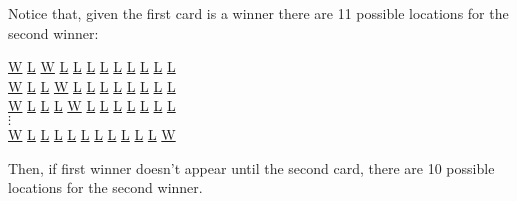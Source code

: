 \documentclass[11pt]{article}
\begin{document}
Notice that, given the first card is a winner there are 11 possible locations for the second winner:
\begin {center}
  \underline{W} \underline{L} \underline{W} \underline{L} \underline{L} \underline{L} \underline{L} \underline{L} \underline{L} \underline{L} \underline{L} \underline{L}\\
  \underline{W} \underline{L} \underline{L} \underline{W} \underline{L} \underline{L} \underline{L} \underline{L} \underline{L} \underline{L} \underline{L} \underline{L}\\
  \underline{W} \underline{L} \underline{L} \underline{L} \underline{W} \underline{L} \underline{L} \underline{L} \underline{L} \underline{L} \underline{L} \underline{L}\\
 $\vdots$ \\
   \underline{W} \underline{L} \underline{L} \underline{L} \underline{L} \underline{L} \underline{L} \underline{L} \underline{L} \underline{L} \underline{L} \underline{W}\\
\end {center}
Then, if first winner doesn't appear until the second card, there are 10 possible locations for the second winner. 
\end{document}
